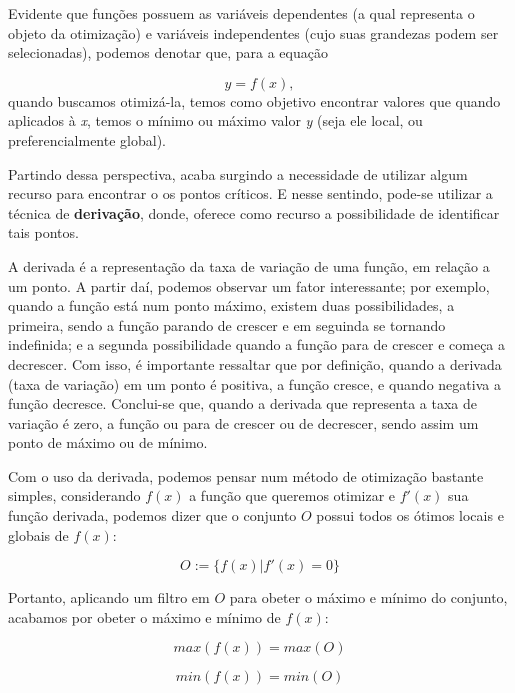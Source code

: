 Evidente que funções possuem as variáveis dependentes (a qual representa o
objeto da otimização) e variáveis independentes (cujo suas grandezas podem ser
selecionadas), podemos denotar que, para a equação

\begin{equation}
	y = f(x),
\end{equation}
quando buscamos otimizá-la, temos como objetivo encontrar valores que quando
aplicados à \textit{x}, temos o mínimo ou máximo valor \textit{y} (seja ele
local, ou preferencialmente global).

Partindo dessa perspectiva, acaba surgindo a necessidade de utilizar algum
recurso para encontrar o os pontos críticos. E nesse sentindo, pode-se utilizar
a técnica de \textbf{derivação}, donde, oferece como recurso a possibilidade de
identificar tais pontos.

A derivada é a representação da taxa de variação de uma função, em relação a
um ponto. A partir daí, podemos observar um fator interessante; por exemplo,
quando a função está num ponto máximo, existem duas possibilidades, a primeira,
sendo a função parando de crescer e em seguinda se tornando indefinida; e a
segunda possibilidade quando a função para de crescer e começa a decrescer.
Com isso, é importante ressaltar que por definição, quando a derivada (taxa de
variação) em um ponto é positiva, a função cresce, e quando negativa a função
decresce. Conclui-se que, quando a derivada que representa a taxa de variação é
zero, a função ou para de crescer ou de decrescer, sendo assim um
ponto de máximo ou de mínimo.

Com o uso da derivada, podemos pensar num método de otimização bastante simples,
considerando \(f(x)\) a função que queremos otimizar e \(f'(x)\) sua função
derivada, podemos dizer que o conjunto $O$ possui todos os ótimos locais e
globais de \(f(x)\):

\begin{equation}
    O := \{f(x) | f'(x) = 0\}
\end{equation}


Portanto, aplicando um filtro em $O$ para obeter o máximo e mínimo do conjunto,
acabamos por obeter o máximo e mínimo de \(f(x)\):


\begin{equation}
    max(f(x)) = max(O)
\end{equation}

\begin{equation}
    min(f(x)) = min(O)
\end{equation}


